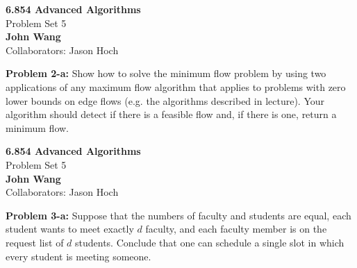 \documentclass[psamsfonts]{amsart}
\newenvironment{sol}{\vspace{0.25cm}{\large \bfseries Solution:}}{\qedsymbol}
\newenvironment{prob}[1]{\begin{framed}{\large \bfseries Problem #1:}}{\end{framed}}
\newcommand{\makenewtitle}{
    \begin{center}
    {\huge \bfseries 6.854 Advanced Algorithms} \\
    Problem Set 5\\
    \vspace{0.25cm}
    {\bfseries John Wang} \\
    Collaborators: Jason Hoch
    \end{center}
    \vspace{0.5cm}
}
\begin{document}
\newpage
\makenewtitle

\begin{prob}{2-a}
Show how to solve the minimum flow problem by using two applications of any maximum flow algorithm that applies to problems with zero lower bounds on edge flows (e.g. the algorithms described in lecture). Your algorithm should detect if there is a feasible flow and, if there is one, return a minimum flow.
\end{prob}
\begin{sol}
\end{sol}

\newpage
\makenewtitle

\begin{prob}{3-a}
Suppose that the numbers of faculty and students are equal, each student wants to meet exactly $d$ faculty, and each faculty member is on the request list of $d$ students. Conclude that one can schedule a single slot in which every student is meeting someone. 
\end{prob}
\end{document}
